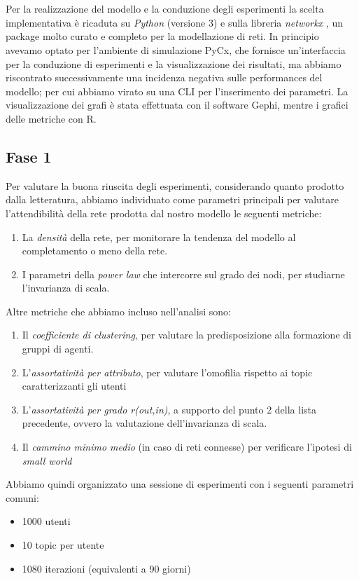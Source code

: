\documentclass[a4paper,12pt]{article}
\begin{document}
\\
\\
Per la realizzazione del modello e la conduzione degli esperimenti la scelta implementativa è ricaduta su \textit{Python} (versione 3) e sulla libreria \textit{networkx} \cite{nx}, un package molto curato e completo per la modellazione di reti. In principio avevamo optato per l'ambiente di simulazione PyCx, che fornisce un'interfaccia per la conduzione di esperimenti e la visualizzazione dei risultati, ma abbiamo riscontrato successivamente una incidenza negativa sulle performances del modello; per cui abbiamo virato su una CLI per l'inserimento dei parametri. La visualizzazione dei grafi è stata effettuata con il software Gephi, mentre i grafici delle metriche con R.
\subsection{Fase 1}
Per valutare la buona riuscita degli esperimenti, considerando quanto prodotto dalla letteratura, abbiamo individuato come parametri principali per valutare l'attendibilità della rete prodotta dal nostro modello le seguenti metriche:
\begin{enumerate}
    \item La \textit{densità} della rete, per monitorare la tendenza del modello al completamento o meno della rete.
    \item I parametri della \textit{power law} che intercorre sul grado dei nodi, per studiarne l'invarianza di scala.
\end{enumerate}
Altre metriche che abbiamo incluso nell'analisi sono:
\begin{enumerate}
    \item Il \textit{coefficiente di clustering}, per valutare la predisposizione alla formazione di gruppi di agenti.
    \item L'\textit{assortatività per attributo}, per valutare l'omofilia rispetto ai topic caratterizzanti gli utenti
    \item L'\textit{assortatività per grado r(out,in)}, a supporto del punto 2 della lista precedente, ovvero la valutazione dell'invarianza di scala.
    \item Il \textit{cammino minimo medio} (in caso di reti connesse) per verificare l'ipotesi di \textit{small world}
\end{enumerate}
Abbiamo quindi organizzato una sessione di esperimenti con i seguenti parametri comuni:
\begin{itemize}
\item 1000 utenti
\item 10 topic per utente
\item 1080 iterazioni (equivalenti a 90 giorni)
\end{itemize}
\end{document}
